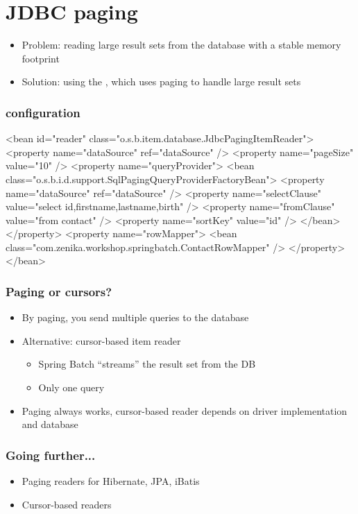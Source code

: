 \section{JDBC paging}

\begin{frame}
 \begin{itemize}
  \item Problem: reading large result sets from the database with a stable memory footprint 
  \item Solution: using the , which uses paging to handle large result sets
 \end{itemize}
\end{frame}


\begin{frame}[fragile]
\frametitle{ configuration}

\lstset{language=XML}
\begin{xmlcode}
<bean id="reader"
      class="o.s.b.item.database.JdbcPagingItemReader">
  <property name="dataSource" ref="dataSource" />
  <property name="pageSize" value="10" />
  <property name="queryProvider">
    <bean class="o.s.b.i.d.support.SqlPagingQueryProviderFactoryBean">
      <property name="dataSource" ref="dataSource" />
      <property name="selectClause" 
                value="select id,firstname,lastname,birth" />
      <property name="fromClause" value="from contact" />
      <property name="sortKey" value="id" />
    </bean>
  </property>
  <property name="rowMapper">
    <bean class="com.zenika.workshop.springbatch.ContactRowMapper" />
  </property>
</bean>
\end{xmlcode}
\end{frame}

\begin{frame}
\frametitle{Paging or cursors?}
\begin{itemize}
 \item By paging, you send multiple queries to the database
 \item Alternative: cursor-based item reader
 \begin{itemize}
  \item Spring Batch “streams” the result set from the DB
  \item Only one query
 \end{itemize}
 \item Paging always works, cursor-based reader depends on driver implementation and database
\end{itemize}
\end{frame}

\begin{frame}
 \frametitle{Going further...}
 \begin{itemize}
  \item Paging readers for Hibernate, JPA, iBatis
  \item Cursor-based readers
 \end{itemize}
\end{frame}

